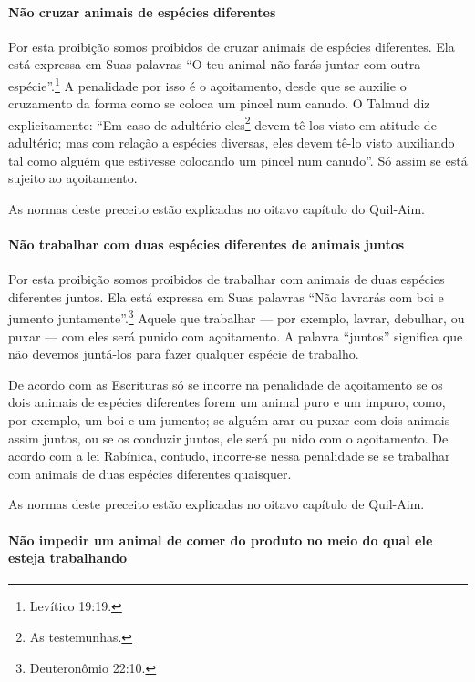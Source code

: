 \paragraph{Não cruzar animais de espécies diferentes}

Por esta proibição somos proibidos de cruzar animais de espécies
diferentes. Ela está expressa em Suas palavras ``O teu animal não farás
juntar com outra espécie''.\footnote{Levítico 19:19.} A penalidade por isso é o
açoitamento, desde que se auxilie o cruzamento da forma como se coloca
um pincel num canudo. O Talmud diz explicitamente: ``Em caso de
adultério eles\footnote{As testemunhas.} devem tê-los visto em atitude de
adultério; mas com relação a espécies diversas, eles devem tê-lo visto
auxiliando tal como alguém que estivesse colocando um pincel num
canudo''. Só assim se está sujeito ao açoitamento.

As normas deste preceito estão explicadas no oitavo capítulo do Quil-Aim.

\paragraph{Não trabalhar com duas espécies diferentes de animais juntos}

Por esta proibição somos proibidos de trabalhar com animais de duas
espécies diferentes juntos. Ela está expressa em Suas palavras ``Não
lavrarás com boi e jumento juntamente''.\footnote{Deuteronômio 22:10.} Aquele que trabalhar
--- por exemplo, lavrar, debulhar, ou puxar --- com eles será punido com
açoitamento. A palavra ``juntos'' significa que não devemos juntá-los
para fazer qualquer espécie de trabalho.

De acordo com as Escrituras só se incorre na penalidade de açoitamento
se os dois animais de espécies diferentes forem um animal puro e um
impuro, como, por exemplo, um boi e um jumento; se alguém arar ou puxar
com dois animais assim juntos, ou se os conduzir juntos, ele será pu
nido com o açoitamento. De acordo com a lei Rabínica, contudo,
incorre-se nessa penalidade se se trabalhar com animais de duas espécies
diferentes quaisquer.

As normas deste preceito estão explicadas no oitavo capítulo de Quil-Aim.

\paragraph{Não impedir um animal de comer do produto no meio do qual ele esteja
trabalhando}

